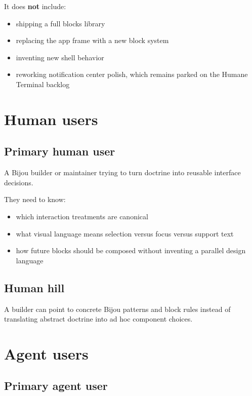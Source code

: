 It does \textbf{not} include:

\begin{itemize}
\tightlist
\item
  shipping a full blocks library
\item
  replacing the app frame with a new block system
\item
  inventing new shell behavior
\item
  reworking notification center polish, which remains parked on the Humane Terminal backlog
\end{itemize}

\section{Human users}\label{record-169-human-users}

\subsection{Primary human user}\label{record-169-primary-human-user}

A Bijou builder or maintainer trying to turn doctrine into reusable interface decisions.

They need to know:

\begin{itemize}
\tightlist
\item
  which interaction treatments are canonical
\item
  what visual language means selection versus focus versus support text
\item
  how future blocks should be composed without inventing a parallel design language
\end{itemize}

\subsection{Human hill}\label{record-169-human-hill}

A builder can point to concrete Bijou patterns and block rules instead of translating abstract doctrine into ad hoc component choices.

\section{Agent users}\label{record-169-agent-users}

\subsection{Primary agent user}\label{record-169-primary-agent-user}

